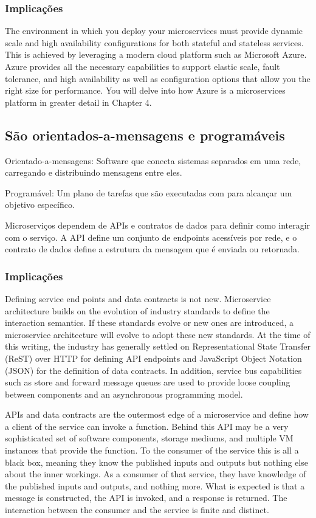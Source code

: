 \subsubsection*{Implicações}

The environment in which you deploy your microservices must provide dynamic scale and high availability configurations for both stateful and stateless services. This is achieved by leveraging a modern cloud platform such as Microsoft Azure. Azure provides all the necessary capabilities to support elastic scale, fault tolerance, and high availability as well as configuration options that allow you the right size for performance. You will delve into how Azure is a microservices platform in greater detail in Chapter 4.

\subsection{São orientados-a-mensagens e programáveis}

Orientado-a-mensagens: Software que conecta sistemas separados em uma rede, carregando e distribuindo mensagens entre eles.

Programável: Um plano de tarefas que são executadas com para alcançar um objetivo específico.

Microserviços dependem de APIs e contratos de dados para definir como interagir com o serviço. A API define um conjunto de endpoints acessíveis por rede, e o contrato de dados define a estrutura da mensagem que é enviada ou retornada.

\subsubsection{Implicações}

Defining service end points and data contracts is not new. Microservice architecture builds on the evolution of industry standards to define the interaction semantics. If these standards evolve or new ones are introduced, a microservice architecture will evolve to adopt these new standards. 
At the time of this writing, the industry has generally settled on Representational State Transfer (ReST) over HTTP for defining API endpoints and JavaScript Object Notation (JSON) for the definition of data contracts. In addition, service bus capabilities such as store and forward message queues are used to provide loose coupling between components and an asynchronous programming model.

APIs and data contracts are the outermost edge of a microservice and define how a client of the service can invoke a function. Behind this API may be a very sophisticated set of software components, storage mediums, and multiple VM instances that provide the function. To the consumer of the service this is all a black box, meaning they know the published inputs and outputs but nothing else about the inner workings. As a consumer of that service, they have knowledge of the published inputs and outputs, and nothing more. What is expected is that a message is constructed, the API is invoked, and a response is returned. The interaction between the consumer and the service is finite and distinct.

